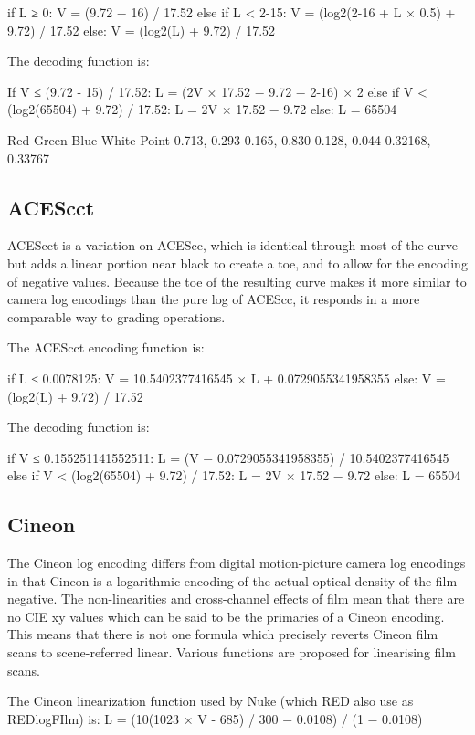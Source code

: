 	if L ≥ 0:
		V = (9.72 − 16) / 17.52
	else if L < 2-15:
		V = (log2(2-16 + L × 0.5) + 9.72) / 17.52
	else:
		V = (log2(L) + 9.72) / 17.52



The decoding function is:

	If V ≤ (9.72 - 15) / 17.52:
		L = (2V × 17.52 − 9.72 − 2-16) × 2
	else if V < (log2(65504) + 9.72) / 17.52:
		L = 2V × 17.52 − 9.72
	else:
		L = 65504


Red
Green
Blue
White Point
0.713, 0.293
0.165, 0.830
0.128, 0.044
0.32168, 0.33767

\subsection{ACEScct}
ACEScct is a variation on ACEScc, which is identical through most of the curve but adds a linear portion near black to create a toe, and to allow for the encoding of negative values. Because the toe of the resulting curve makes it more similar to camera log encodings than the pure log of ACEScc, it responds in a more comparable way to grading operations.

The ACEScct encoding function is:

	if L ≤ 0.0078125:
		V = 10.5402377416545 × L + 0.0729055341958355
	else:
		V = (log2(L) + 9.72) / 17.52



The decoding function is:

	if V ≤ 0.155251141552511:
		L = (V − 0.0729055341958355) / 10.5402377416545
	else if V < (log2(65504) + 9.72) / 17.52:
		L = 2V × 17.52 − 9.72
	else:
		L = 65504

\subsection{Cineon}

The Cineon log encoding differs from digital motion-picture camera log encodings in that Cineon is a logarithmic encoding of the actual optical density of the film negative. The non-linearities and cross-channel effects of film mean that there are no CIE xy values which can be said to be the primaries of a Cineon encoding. This means that there is not one formula which precisely reverts Cineon film scans to scene-referred linear. Various functions are proposed for linearising film scans.

The Cineon linearization function used by Nuke (which RED also use as REDlogFIlm) is:
	L = (10(1023 × V - 685) / 300 − 0.0108) / (1 − 0.0108)



